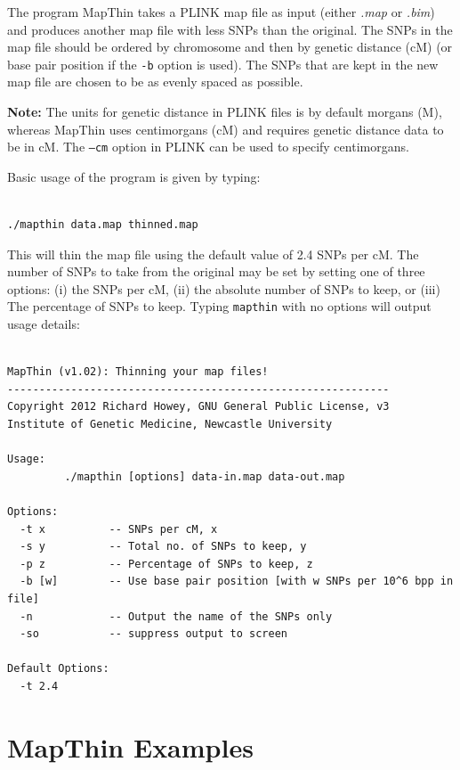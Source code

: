 \documentclass[a4paper,12pt]{article}
\newcommand{\code}[1]{{\footnotesize{{\tt #1}}}}
\begin{document}
The program MapThin takes a PLINK map file as input (either {\it .map} or {\it .bim}) and produces another map file with less SNPs than the original. The SNPs in the map file should be ordered by chromosome and then by genetic distance (cM) (or base pair position if the \code{-b} option is used). The SNPs that are kept in the new map file are chosen to be as evenly spaced as possible. 

{\bf Note:} The units for genetic distance in PLINK files is by default morgans (M), whereas MapThin uses centimorgans (cM) and requires genetic distance data to be in cM. The \code{--cm} option in PLINK can be used to specify centimorgans. 

Basic usage of the program is given by typing: 
\vspace{0.35cm} \begin{lstlisting}

./mapthin data.map thinned.map

\end{lstlisting} \vspace{0.35cm}
This will thin the map file using the default value of 2.4 SNPs per cM. The number of SNPs to take from the original may be set by setting one of three options: (i) the SNPs per cM, (ii) the absolute number of SNPs to keep, or (iii) The percentage of SNPs to keep. Typing \code{mapthin} with no options will output usage details: 
\vspace{0.35cm} \begin{lstlisting}

MapThin (v1.02): Thinning your map files!
------------------------------------------------------------
Copyright 2012 Richard Howey, GNU General Public License, v3
Institute of Genetic Medicine, Newcastle University

Usage:
         ./mapthin [options] data-in.map data-out.map

Options:
  -t x          -- SNPs per cM, x
  -s y          -- Total no. of SNPs to keep, y
  -p z          -- Percentage of SNPs to keep, z
  -b [w]        -- Use base pair position [with w SNPs per 10^6 bpp in file]
  -n            -- Output the name of the SNPs only
  -so           -- suppress output to screen

Default Options:
  -t 2.4

\end{lstlisting} \vspace{0.35cm}

\section{MapThin Examples}
\label{example}
\end{document}
